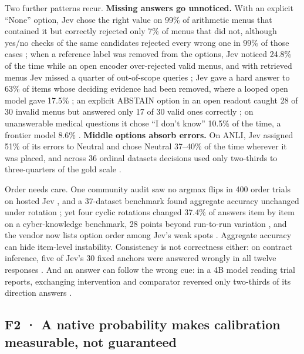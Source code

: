 Two further patterns recur. \textbf{Missing answers go unnoticed.} With an explicit “None” option, Jev chose the right value on 99\% of arithmetic menus that contained it but correctly rejected only 7\% of menus that did not, although yes/no checks of the same candidates rejected every wrong one in 99\% of those cases \citep{arxiv2609_39496}; when a reference label was removed from the options, Jev noticed 24.8\% of the time while an open encoder over-rejected valid menus, and with retrieved menus Jev missed a quarter of out-of-scope queries \citep{arxiv2610_03387}; Jev gave a hard answer to 63\% of items whose deciding evidence had been removed, where a looped open model gave 17.5\% \citep{arxiv2610_07730}; an explicit ABSTAIN option in an open readout caught 28 of 30 invalid menus but answered only 17 of 30 valid ones correctly \citep{arxiv2610_07327}; on unanswerable medical questions it chose “I don't know” 10.5\% of the time, a frontier model 8.6\% \citep{arxiv2609_34024}. \textbf{Middle options absorb errors.} On ANLI, Jev assigned 51\% of its errors to Neutral and chose Neutral 37–40\% of the time wherever it was placed, and across 36 ordinal datasets decisions used only two-thirds to three-quarters of the gold scale \citep{arxiv2609_38827}.

Order needs care. One community audit saw no argmax flips in 400 order trials on hosted Jev \citep{gh_jujumilk3_jev_calibration_audit}, and a 37-dataset benchmark found aggregate accuracy unchanged under rotation \citep{arxiv2609_37647}; yet four cyclic rotations changed 37.4\% of answers item by item on a cyber-knowledge benchmark, 28 points beyond run-to-run variation \citep{arxiv2609_30454}, and the vendor now lists option order among Jev's weak spots \citep{typesafe2026jaggedness}. Aggregate accuracy can hide item-level instability. Consistency is not correctness either: on contract inference, five of Jev's 30 fixed anchors were answered wrongly in all twelve responses \citep{arxiv2609_27678}. And an answer can follow the wrong cue: in a 4B model reading trial reports, exchanging intervention and comparator reversed only two-thirds of its direction answers \citep{arxiv2610_07019}.

\subsection{F2 · A native probability makes calibration measurable, not guaranteed}


